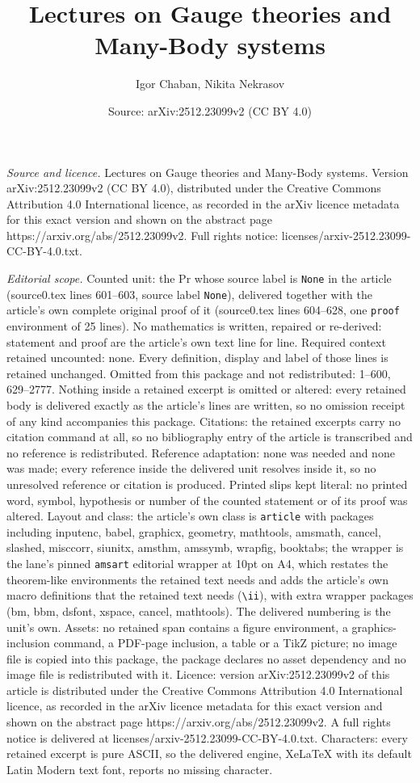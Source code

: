\documentclass[10pt,a4paper]{amsart}
\title[Lectures on Gauge theories and Many-Body systems]{Lectures on Gauge theories and Many-Body systems}
\author{Igor Chaban, Nikita Nekrasov}
\date{Source: arXiv:2512.23099v2 (CC BY 4.0)}
\begin{document}
\maketitle

\noindent\emph{Source and licence.} Lectures on Gauge theories and Many-Body systems. Version arXiv:2512.23099v2 (CC BY 4.0), distributed under the Creative Commons Attribution 4.0 International licence, as recorded in the arXiv licence metadata for this exact version and shown on the abstract page https://arxiv.org/abs/2512.23099v2. Full rights notice: licenses/arxiv-2512.23099-CC-BY-4.0.txt.\par\smallskip

\noindent\textit{Editorial scope.} Counted unit: the Pr whose source label is \texttt{None} in the article (source0.tex lines 601--603, source label \texttt{None}), delivered together with the article's own complete original proof of it (source0.tex lines 604--628, one \texttt{proof} environment of 25 lines). No mathematics is written, repaired or re-derived: statement and proof are the article's own text line for line. Required context retained uncounted: none. Every definition, display and label of those lines is retained unchanged. Omitted from this package and not redistributed: 1--600, 629--2777. Nothing inside a retained excerpt is omitted or altered: every retained body is delivered exactly as the article's lines are written, so no omission receipt of any kind accompanies this package. Citations: the retained excerpts carry no citation command at all, so no bibliography entry of the article is transcribed and no reference is redistributed. Reference adaptation: none was needed and none was made; every reference inside the delivered unit resolves inside it, so no unresolved reference or citation is produced. Printed slips kept literal: no printed word, symbol, hypothesis or number of the counted statement or of its proof was altered. Layout and class: the article's own class is \texttt{article} with packages including inputenc, babel, graphicx, geometry, mathtools, amsmath, cancel, slashed, misccorr, siunitx, amsthm, amssymb, wrapfig, booktabs; the wrapper is the lane's pinned \texttt{amsart} editorial wrapper at 10pt on A4, which restates the theorem-like environments the retained text needs and adds the article's own macro definitions that the retained text needs (\texttt{\textbackslash ii}), with extra wrapper packages (bm, bbm, dsfont, xspace, cancel, mathtools). The delivered numbering is the unit's own. Assets: no retained span contains a figure environment, a graphics-inclusion command, a PDF-page inclusion, a table or a TikZ picture; no image file is copied into this package, the package declares no asset dependency and no image file is redistributed with it. Licence: version arXiv:2512.23099v2 of this article is distributed under the Creative Commons Attribution 4.0 International licence, as recorded in the arXiv licence metadata for this exact version and shown on the abstract page https://arxiv.org/abs/2512.23099v2. A full rights notice is delivered at licenses/arxiv-2512.23099-CC-BY-4.0.txt. Characters: every retained excerpt is pure ASCII, so the delivered engine, XeLaTeX with its default Latin Modern text font, reports no missing character.
\end{document}
